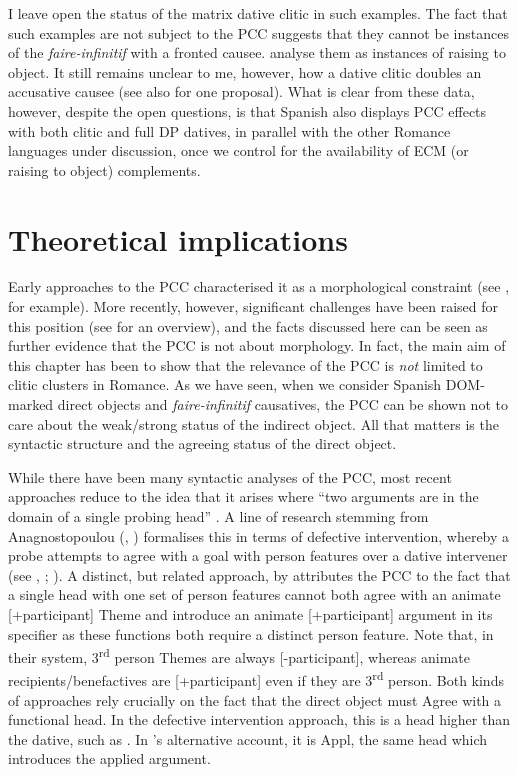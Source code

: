\documentclass[output=paper,colorlinks,citecolor=brown,nonflat]{langsci/langscibook}
\begin{document}
I leave open the status of the matrix dative clitic in such examples. The fact that such examples are not subject to the PCC suggests that they cannot be instances of the \textit{faire-infinitif} with a fronted causee. \citet{OrmazabalRomero2013Borealis} analyse them as instances of raising to object. It still remains unclear to me, however, how a dative clitic doubles an accusative causee (see also \citealt{OrdóñezSaab2017} for one proposal). What is clear from these data, however, despite the open questions, is that Spanish also displays PCC effects with both clitic and full DP datives, in parallel with the other Romance languages under discussion, once we control for the availability of ECM (or raising to object) complements.

\section{Theoretical implications}\label{sec:sheehan:5}

Early approaches to the PCC characterised it as a morphological constraint (see \citealt{Bonet1991}, for example). More recently, however, significant challenges have been raised for this position (see \citealt{Preminger2019} for an overview), and the facts discussed here can be seen as further evidence that the PCC is not about morphology. In fact, the main aim of this chapter has been to show that the relevance of the PCC is \textit{not} limited to clitic clusters in Romance. As we have seen, when we consider Spanish DOM-marked direct objects and \textit{faire-infinitif} causatives, the PCC can be shown not to care about the weak/strong status of the indirect object. All that matters is the syntactic structure and the agreeing status of the direct object.

While there have been many syntactic analyses of the PCC, most recent approaches reduce to the idea that it arises where “two arguments are in the domain of a single probing head” \citep[290]{Nevins2007}. A line of research stemming from Anagnostopoulou (\citeyear{Anagnostopoulou2003}, \citeyear{Anagnostopoulou2005}) formalises this in terms of defective intervention, whereby a probe attempts to agree with a goal with person features over a dative intervener (see \citealt{Anagnostopoulou2003}, \citeyear{Anagnostopoulou2005}; \citealt{Nevins2007, Rezac2008, Preminger2019}). A distinct, but related approach, by \citet{AdgerHarbour2007} attributes the PCC to the fact that a single head with one set of person features cannot both agree with an animate [+participant] Theme and introduce an animate [+participant] argument in its specifier as these functions both require a distinct person feature. Note that, in their system, 3\textsuperscript{rd} person Themes are always [-participant], whereas animate recipients/benefactives are [+participant] even if they are 3\textsuperscript{rd} person.  Both kinds of approaches rely crucially on the fact that the direct object must Agree with a functional head. In the defective intervention approach, this is a head higher than the dative, such as {\liv}. In \citeauthor{AdgerHarbour2007}’s alternative account, it is Appl, the same head which introduces the applied argument.
\end{document}

